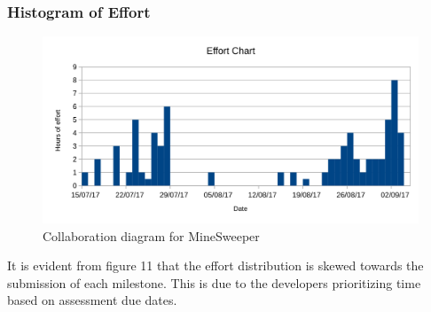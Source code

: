 \documentclass[12pt, a4]{report}
\begin{document}
\newpage
\clearpage
\subsubsection{Histogram of Effort}
\begin{figure}[!h]
	\centering
	\includegraphics[scale=1]{Histogram}
	\caption{Collaboration diagram for MineSweeper}
\end{figure}

\par It is evident from figure 11 that the effort distribution is skewed towards the submission of each milestone. This is due to the developers prioritizing time based on assessment due dates.

	
	
	
	
\end{document}
